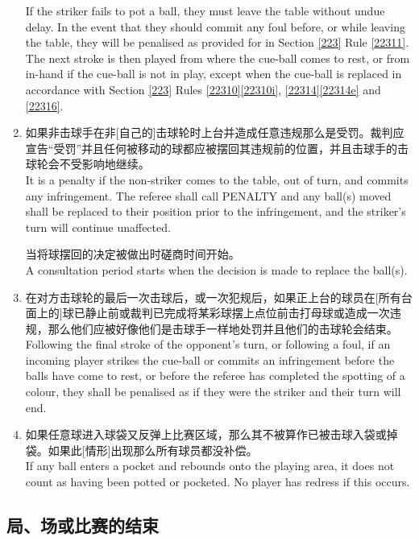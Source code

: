 \begin{enumerate}[label=(\alph*)]
    If the striker fails to pot a ball, they must leave the table without undue delay. In the event that they should commit any foul before, or while leaving the table, they will be penalised as provided for in Section \ref{223} Rule \ref{22311}. The next stroke is then played from where the cue-ball comes to rest, or from in-hand if the cue-ball is not in play, except when the cue-ball is replaced in accordance with Section \ref{223} Rules \ref{22310}\ref{22310i}, \ref{22314}\ref{22314e} and \ref{22316}.
    \item \label{2233k}如果非击球手在非[自己的]击球轮时上台并造成任意违规那么是受罚。裁判应宣告``受罚''并且任何被移动的球都应被摆回其违规前的位置，并且击球手的击球轮会不受影响地继续。\\
    It is a penalty if the non-striker comes to the table, out of turn, and commits any infringement. The referee shall call PENALTY and any ball(s) moved shall be replaced to their position prior to the infringement, and the striker's turn will continue unaffected.

    当将球摆回的决定被做出时磋商时间开始。\\
    A consultation period starts when the decision is made to replace the ball(s).
    \item 在对方击球轮的最后一次击球后，或一次犯规后，如果正上台的球员在[所有台面上的]球已静止前或裁判已完成将某彩球摆上点位前击打母球或造成一次违规，那么他们应被好像他们是击球手一样地处罚并且他们的击球轮会结束。\\
    Following the final stroke of the opponent's turn, or following a foul, if an incoming player strikes the cue-ball or commits an infringement before the balls have come to rest, or before the referee has completed the spotting of a colour, they shall be penalised as if they were the striker and their turn will end.
    \item 如果任意球进入球袋又反弹上比赛区域，那么其不被算作已被击球入袋或掉袋。如果此[情形]出现那么所有球员都没补偿。\\
    If any ball enters a pocket and rebounds onto the playing area, it does not count as having been potted or pocketed. No player has redress if this occurs.
\end{enumerate}

\subsection{局、场或比赛的结束}\label{2234}

